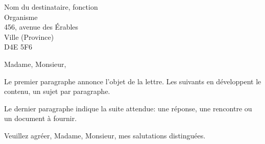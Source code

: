 \documentclass[version=last, paper=letter, fromalign=right, fromphone,
  fromemail, foldmarks=false, parskip=half]{scrlttr2}
\begin{document}
\begin{letter}{%
  Nom du destinataire, fonction\\
  Organisme\\
  456, avenue des Érables\\
  Ville (Province)\\
  D4E 5F6%
}

\opening{Madame, Monsieur,}

Le premier paragraphe annonce l'objet de la lettre. Les suivants en
développent le contenu, un sujet par paragraphe.

Le dernier paragraphe indique la suite attendue: une réponse, une rencontre
ou un document à fournir.

\closing{Veuillez agréer, Madame, Monsieur, mes salutations distinguées.}


\end{letter}
\end{document}
